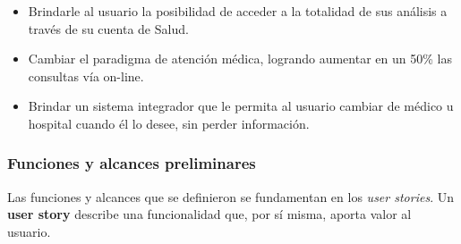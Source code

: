     \begin{itemize}
	    \item Brindarle al usuario la posibilidad de acceder a la totalidad de sus análisis a través de su cuenta de Salud.
    	\item Cambiar el paradigma de atención médica, logrando aumentar en un 50\% las consultas vía on-line.
        \item Brindar un sistema integrador que le permita al usuario cambiar de médico u hospital cuando él lo desee, sin perder información.
	\end{itemize}




\subsubsection{Funciones y alcances preliminares}
Las funciones y alcances que se definieron se fundamentan en los \textit{user stories}. Un \textbf{user story} describe una funcionalidad que, por sí misma, aporta valor al usuario.

